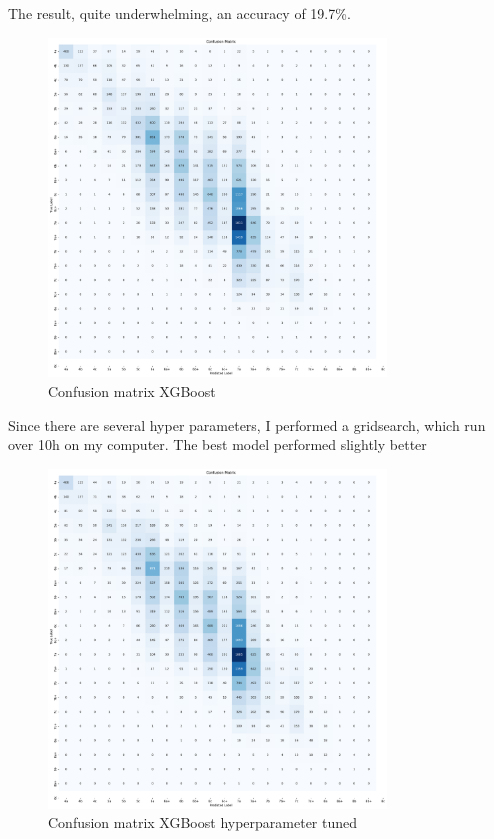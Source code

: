 \documentclass{article}
\begin{document}
The result, quite underwhelming, an accuracy of 19.7\%. 
\begin{figure}[H]
    \centering    
    \includegraphics[width=0.8\textwidth]{../Models/XGBoost/confusion_matrix.pdf}
    \caption{Confusion matrix XGBoost}\label{fig:conf_xgboost1}
\end{figure}

Since there are several hyper parameters, I performed a gridsearch, which run over 10h on my computer.
The best model performed slightly better
\begin{figure}[H]
    \centering    
    \includegraphics[width=0.8\textwidth]{../Models/XGBoost/confusion_matrix_best_param.pdf}
    \caption{Confusion matrix XGBoost hyperparameter tuned}\label{fig:conf_xgboost1}
\end{figure}
\end{document}
